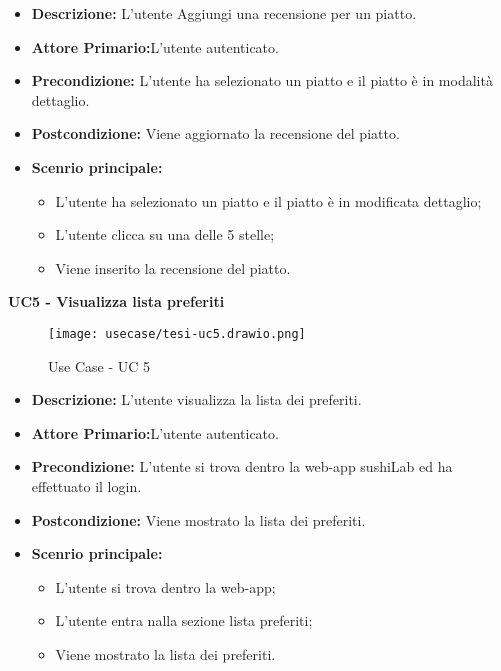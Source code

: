 \begin{itemize}
    \item \textbf{Descrizione:} L'utente Aggiungi una recensione per un piatto.
    \item \textbf{Attore Primario:}L'utente autenticato.
    \item \textbf{Precondizione:} L'utente ha selezionato un piatto e il piatto è in modalità dettaglio.
    \item \textbf{Postcondizione:} Viene aggiornato la recensione del piatto.
    \item \textbf{Scenrio principale:}
    \begin{itemize}
        \item L'utente ha selezionato un piatto e il piatto è in modificata dettaglio;
        \item L'utente clicca su una delle 5 stelle;
        \item Viene inserito la recensione del piatto.
    \end{itemize}
\end{itemize}
\textbf{UC5 - Visualizza lista preferiti}
\begin{figure}[H]
    \centering
    \texttt{[image: usecase/tesi-uc5.drawio.png]}
    \caption{Use Case - UC 5}
\end{figure}
\begin{itemize}
    \item \textbf{Descrizione:} L'utente visualizza la lista dei preferiti.
    \item \textbf{Attore Primario:}L'utente autenticato.
    \item \textbf{Precondizione:} L'utente si trova dentro la web-app sushiLab ed ha effettuato il login.
    \item \textbf{Postcondizione:} Viene mostrato la lista dei preferiti.
    \item \textbf{Scenrio principale:}
    \begin{itemize}
        \item L'utente si trova dentro la web-app;
        \item L'utente entra nalla sezione lista preferiti;
        \item Viene mostrato la lista dei preferiti.
    \end{itemize}
\end{itemize}
